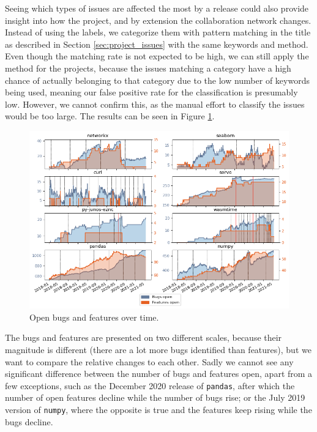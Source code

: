 Seeing which types of issues are affected the most by a release could also provide insight into how the project, and by extension the collaboration network changes. Instead of using the labels, we categorize them with pattern matching in the title as described in Section \ref{sec:project_issues} with the same keywords and method. Even though the matching rate is not expected to be high, we can still apply the method for the projects, because the issues matching a category have a high chance of actually belonging to that category due to the low number of keywords being used, meaning our false positive rate for the classification is presumably low. However, we cannot confirm this, as the manual effort to classify the issues would be too large. The results can be seen in Figure \ref{fig:open_bugs_features}.

\begin{figure}
    \centering
    \includegraphics[width=\textwidth]{figures/qualitative/issues_closed_created/features_and_bugs.png}
    \caption{Open bugs and features over time.}
    \label{fig:open_bugs_features}
\end{figure}

The bugs and features are presented on two different scales, because their magnitude is different (there are a lot more bugs identified than features), but we want to compare the relative changes to each other. Sadly we cannot see any significant difference between the number of bugs and features open, apart from a few exceptions, such as the December 2020 release of \texttt{pandas}, after which the number of open features decline while the number of bugs rise; or the July 2019 version of \texttt{numpy}, where the opposite is true and the features keep rising while the bugs decline.


